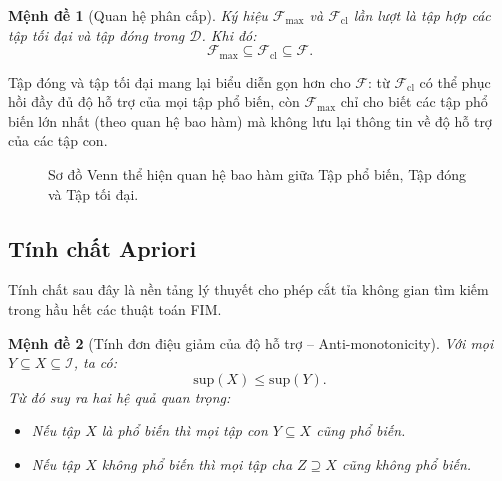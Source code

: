 \documentclass[12pt,a4paper]{report}
\newtheorem{proposition}{Mệnh đề}[chapter]
\begin{document}
\begin{proposition}[Quan hệ phân cấp]
Ký hiệu $\mathcal{F}_{\mathrm{max}}$ và $\mathcal{F}_{\mathrm{cl}}$ lần lượt là tập
hợp các tập tối đại và tập đóng trong $\mathcal{D}$. Khi đó:
\begin{equation}
    \mathcal{F}_{\mathrm{max}} \subseteq \mathcal{F}_{\mathrm{cl}} \subseteq
    \mathcal{F}.
    \label{eq:hierarchy}
\end{equation}
\end{proposition}
 
Tập đóng và tập tối đại mang lại biểu diễn gọn hơn cho $\mathcal{F}$: từ
$\mathcal{F}_{\mathrm{cl}}$ có thể phục hồi đầy đủ độ hỗ trợ của mọi tập phổ biến,
còn $\mathcal{F}_{\mathrm{max}}$ chỉ cho biết các tập phổ biến lớn nhất (theo quan
hệ bao hàm) mà không lưu lại thông tin về độ hỗ trợ của các tập con.

\begin{figure}[H]
\centering
{}
\caption{Sơ đồ Venn thể hiện quan hệ bao hàm giữa Tập phổ biến, Tập đóng và Tập tối đại.}
\label{fig:venn-fcm}
\end{figure}
 
\subsection{Tính chất Apriori}
 
Tính chất sau đây là nền tảng lý thuyết cho phép cắt tỉa không gian tìm kiếm trong
hầu hết các thuật toán FIM.
 
\begin{proposition}[Tính đơn điệu giảm của độ hỗ trợ -- Anti-monotonicity]
\label{prop:antimonotone}
Với mọi $Y \subseteq X \subseteq \mathcal{I}$, ta có:
\begin{equation}
    \mathrm{sup}(X) \leq \mathrm{sup}(Y).
    \label{eq:apriori}
\end{equation}
Từ đó suy ra hai hệ quả quan trọng:
\begin{itemize}
    \item Nếu tập $X$ là phổ biến thì mọi tập con $Y \subseteq X$ cũng phổ biến.
    \item Nếu tập $X$ không phổ biến thì mọi tập cha $Z \supseteq X$ cũng không
    phổ biến.
\end{itemize}
\end{proposition}
 
\end{document}
